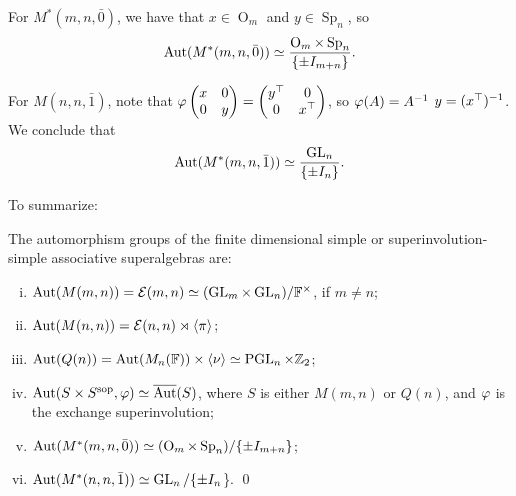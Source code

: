 For $M^*(m,n, \bar 0)$, 
we have that 
$x \in \operatorname{O}_m$ and $y \in \operatorname{Sp}_n$, 
so
\[
    \operatorname{Aut}(M^*(m,n, \bar 0)) \simeq \frac{\operatorname{O}_m \times \operatorname{Sp}_n}{\{\pm I_{m+n}\}}.
\] 

For $M(n,n, \bar 1)$, note that 
$\vphi %
\begin{pmatrix}
    x & 0\\
    0 & y
\end{pmatrix}
= 
\begin{pmatrix}
    y\transp & 0\\
    0 & x\transp
\end{pmatrix}$, so $\varphi(A) = A^{-1}$ \IFF $y = (x^{\top})^{-1}$. 
We conclude that
\[
    \operatorname{Aut}(M^*(m,n, \bar 1)) \simeq \frac{\operatorname{GL}_n}{\{ \pm I_n\}}. 
\]

To summarize:

\begin{prop}\label{prop:Aut-associative}
    The automorphism groups of the finite dimensional simple or superinvolution-simple associative superalgebras are: 
    \begin{enumerate}[(i)]
        \item $\operatorname{Aut}(M(m,n)) = \mathcal E(m,n) \simeq (\operatorname{GL}_m \times \operatorname{GL}_n)/\mathbb{F}^\times$, if $m\neq n$;
        \item $\operatorname{Aut}(M(n,n)) = \mathcal E(n,n) \rtimes \langle \pi \rangle$;
        \item $\operatorname{Aut}(Q(n)) = \operatorname{Aut}(M_n(\mathbb{F})) \times \langle \nu \rangle \simeq \operatorname{PGL}_n \times \mathbb{Z}_2$;
        \item $\operatorname{Aut}(S\times S^{\mathrm{sop}}, \varphi) \simeq \overline{\operatorname{Aut}}(S)$, where $S$ is either $M(m,n)$ or $Q(n)$, and $\varphi$ is the exchange superinvolution;
        \item $\operatorname{Aut}(M^*(m,n, \bar 0)) \simeq (\operatorname{O}_m \times \operatorname{Sp}_n)/\{ \pm I_{m+n}\}$;
        \item $\operatorname{Aut}(M^*(n,n, \bar 1)) \simeq \operatorname{GL}_n/\{ \pm I_n$\}. \qed
    \end{enumerate}
\end{prop}


